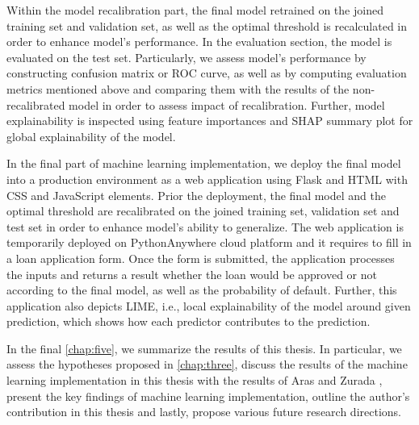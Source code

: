 Within the model recalibration part, the final model retrained on the joined training set and validation set, as well as the optimal threshold is recalculated in order to enhance model's performance.
In the evaluation section, the model is evaluated on the test set. Particularly, we assess model's performance by constructing confusion matrix or ROC curve, as well as by computing evaluation metrics mentioned above and comparing them with the results of the non-recalibrated model in order to assess impact of recalibration. Further, model explainability is inspected using feature importances and SHAP summary plot for global explainability of the model.

In the final part of machine learning implementation, we deploy the final model into a production environment as a web application using Flask and HTML with CSS and JavaScript elements. Prior the deployment, the final model and the optimal threshold are recalibrated on the joined training set, validation set and test set in order to enhance model's ability to generalize. 
The web application is temporarily deployed on PythonAnywhere cloud platform and it requires to fill in a loan application form. Once the form is submitted, the application processes the inputs and returns a result whether the loan would be approved or not according to the final model, as well as the probability of default. Further, this application also depicts LIME, i.e., local explainability of the model around given prediction, which shows how each predictor contributes to the prediction.

In the final \autoref{chap:five}, we summarize the results of this thesis. In particular, we assess the hypotheses proposed in \autoref{chap:three}, discuss the results of the machine learning implementation in this thesis with the results of Aras \citep{serkan2021bagging} and Zurada \citep{zurada2014classification}, present the key findings of machine learning implementation, outline the author's contribution in this thesis and lastly, propose various future research directions.

